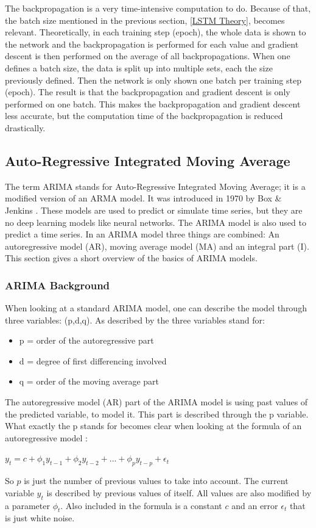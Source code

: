 The backpropagation is a very time-intensive computation to do.
Because of that, the batch size mentioned in the previous section, \ref{LSTM Theory}, becomes relevant.
Theoretically, in each training step (epoch), the whole data is shown to the network and the backpropagation is performed for each value and gradient descent is then performed on the average of all backpropagations.
When one defines a batch size, the data is split up into multiple sets, each the size previously defined.
Then the network is only shown one batch per training step (epoch).
The result is that the backpropagation and gradient descent is only performed on one batch.
This makes the backpropagation and gradient descent less accurate, but the computation time of the backpropagation is reduced drastically.

\subsection{Auto-Regressive Integrated Moving Average} \label{arima}
The term ARIMA stands for Auto-Regressive Integrated Moving Average; it is a modified version of an ARMA model.
It was introduced in 1970 by Box \& Jenkins \cite{001285997}.
These models are used to predict or simulate time series, but they are no deep learning models like neural networks.
The ARIMA model is also used to predict a time series.
In an ARIMA model three things are combined: An autoregressive model (AR), moving average model (MA) and an integral part (I).
This section gives a short overview of the basics of ARIMA models.
\subsubsection{ARIMA Background}\label{arimaBackground}
When looking at a standard ARIMA model, one can describe the model through three variables: (p,d,q).
As described by \cite{forecasting} the three variables stand for:
\begin{itemize}
	\item p = order of the autoregressive part
	\item d = degree of first differencing involved
	\item q = order of the moving average part
\end{itemize}
The autoregressive model (AR) part of the ARIMA model is using past values of the predicted variable, to model it.
This part is described through the p variable.
What exactly the p stands for becomes clear when looking at the formula of an autoregressive model \cite{forecasting}:
\begin{displayquote}
	$y_t = c+\phi_1y_{t-1}+\phi_2y_{t-2}+...+\phi_p y_{t-p}+\epsilon_t$
\end{displayquote}
So $p$ is just the number of previous values to take into account.
The current variable $y_t$ is described by previous values of itself.
All values are also modified by a parameter $\phi_t$.
Also included in the formula is a constant $c$ and an error $\epsilon_t$ that is just white noise.

